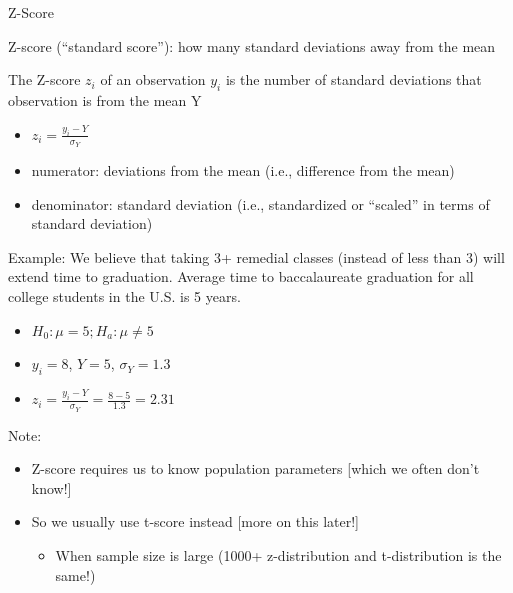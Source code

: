 \documentclass[
  8pt,
  ignorenonframetext,
  dvipsnames]{beamer}
\providecommand{\tightlist}{%
  \setlength{\itemsep}{0pt}\setlength{\parskip}{0pt}}
\let\olditem\item
\renewcommand{\item}{%
  \olditem\vspace{4pt}
}
\begin{document}
\begin{frame}{Z-Score}
\protect\hypertarget{z-score}{}

Z-score (``standard score''): how many standard deviations away from the
mean

\medskip

The Z-score \(z_i\) of an observation \(y_i\) is the number of standard
deviations that observation is from the mean Y

\begin{itemize}
\tightlist
\item
  \(z_i = \frac{y_i - Y}{\sigma_Y}\)
\item
  numerator: deviations from the mean (i.e., difference from the mean)
\item
  denominator: standard deviation (i.e., standardized or ``scaled'' in
  terms of standard deviation)
\end{itemize}

\medskip

Example: We believe that taking 3+ remedial classes (instead of less
than 3) will extend time to graduation. Average time to baccalaureate
graduation for all college students in the U.S. is 5 years.

\begin{itemize}
\tightlist
\item
  \(H_0: \mu = 5 ; H_a: \mu \ne 5\)
\item
  \(y_i = 8\), \(Y=5\), \(\sigma_Y = 1.3\)
\item
  \(z_i = \frac{y_i - Y}{\sigma_Y} = \frac{8 - 5}{1.3} = 2.31\)
\end{itemize}

\medskip

Note:

\begin{itemize}
\tightlist
\item
  Z-score requires us to know population parameters {[}which we often
  don't know!{]}
\item
  So we usually use t-score instead {[}more on this later!{]}

  \begin{itemize}
  \tightlist
  \item
    When sample size is large (1000+ z-distribution and t-distribution
    is the same!)
  \end{itemize}
\end{itemize}

\end{frame}
\end{document}
